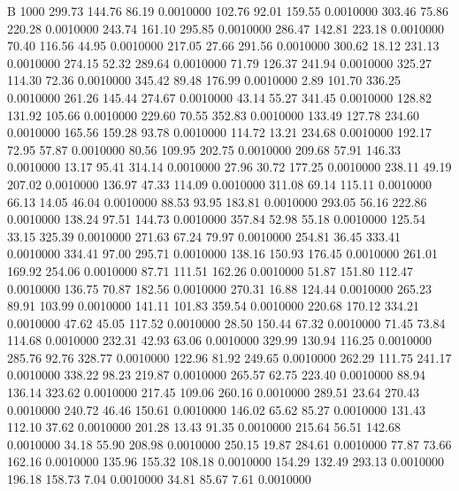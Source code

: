


B 1000
 299.73  144.76   86.19   0.0010000
 102.76   92.01  159.55   0.0010000
 303.46   75.86  220.28   0.0010000
 243.74  161.10  295.85   0.0010000
 286.47  142.81  223.18   0.0010000
  70.40  116.56   44.95   0.0010000
 217.05   27.66  291.56   0.0010000
 300.62   18.12  231.13   0.0010000
 274.15   52.32  289.64   0.0010000
  71.79  126.37  241.94   0.0010000
 325.27  114.30   72.36   0.0010000
 345.42   89.48  176.99   0.0010000
   2.89  101.70  336.25   0.0010000
 261.26  145.44  274.67   0.0010000
  43.14   55.27  341.45   0.0010000
 128.82  131.92  105.66   0.0010000
 229.60   70.55  352.83   0.0010000
 133.49  127.78  234.60   0.0010000
 165.56  159.28   93.78   0.0010000
 114.72   13.21  234.68   0.0010000
 192.17   72.95   57.87   0.0010000
  80.56  109.95  202.75   0.0010000
 209.68   57.91  146.33   0.0010000
  13.17   95.41  314.14   0.0010000
  27.96   30.72  177.25   0.0010000
 238.11   49.19  207.02   0.0010000
 136.97   47.33  114.09   0.0010000
 311.08   69.14  115.11   0.0010000
  66.13   14.05   46.04   0.0010000
  88.53   93.95  183.81   0.0010000
 293.05   56.16  222.86   0.0010000
 138.24   97.51  144.73   0.0010000
 357.84   52.98   55.18   0.0010000
 125.54   33.15  325.39   0.0010000
 271.63   67.24   79.97   0.0010000
 254.81   36.45  333.41   0.0010000
 334.41   97.00  295.71   0.0010000
 138.16  150.93  176.45   0.0010000
 261.01  169.92  254.06   0.0010000
  87.71  111.51  162.26   0.0010000
  51.87  151.80  112.47   0.0010000
 136.75   70.87  182.56   0.0010000
 270.31   16.88  124.44   0.0010000
 265.23   89.91  103.99   0.0010000
 141.11  101.83  359.54   0.0010000
 220.68  170.12  334.21   0.0010000
  47.62   45.05  117.52   0.0010000
  28.50  150.44   67.32   0.0010000
  71.45   73.84  114.68   0.0010000
 232.31   42.93   63.06   0.0010000
 329.99  130.94  116.25   0.0010000
 285.76   92.76  328.77   0.0010000
 122.96   81.92  249.65   0.0010000
 262.29  111.75  241.17   0.0010000
 338.22   98.23  219.87   0.0010000
 265.57   62.75  223.40   0.0010000
  88.94  136.14  323.62   0.0010000
 217.45  109.06  260.16   0.0010000
 289.51   23.64  270.43   0.0010000
 240.72   46.46  150.61   0.0010000
 146.02   65.62   85.27   0.0010000
 131.43  112.10   37.62   0.0010000
 201.28   13.43   91.35   0.0010000
 215.64   56.51  142.68   0.0010000
  34.18   55.90  208.98   0.0010000
 250.15   19.87  284.61   0.0010000
  77.87   73.66  162.16   0.0010000
 135.96  155.32  108.18   0.0010000
 154.29  132.49  293.13   0.0010000
 196.18  158.73    7.04   0.0010000
  34.81   85.67    7.61   0.0010000
